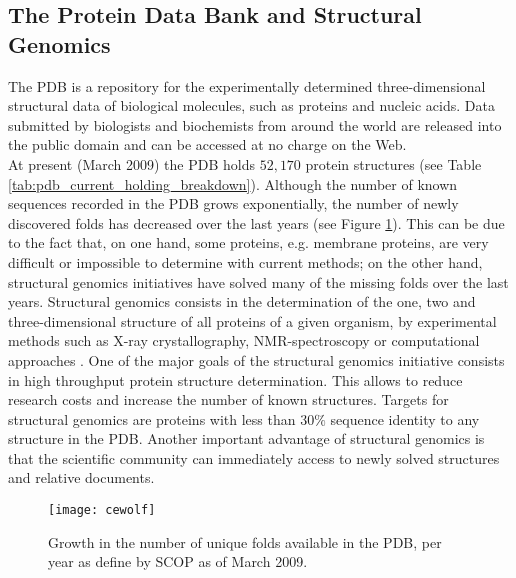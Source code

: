 \subsection{The Protein Data Bank and Structural Genomics}
\label{subsec:the_protein_data_bank_and_structural_genomics}
The \gls{PDB} \cite{Berman2002aa} is a repository for the experimentally determined three-\-di\-men\-sio\-nal structural data of biological molecules, such as proteins and nucleic acids. Data submitted by biologists and biochemists from around the world are released into the public domain and can be accessed at no charge on the Web.\\
At present (March 2009) the PDB holds $52,170$ protein structures (see Table \ref{tab:pdb_current_holding_breakdown}). 
Although the number of known sequences recorded in the PDB grows exponentially, the number of newly discovered folds has decreased over the last years (see Figure \ref{fig:cewolf}). This can be due to the fact that, on one hand, some proteins, e.g. membrane proteins, are very difficult or impossible to determine with current methods; on the other hand, structural genomics initiatives have solved many of the missing folds over the last years.
Structural genomics consists in the determination of the one, two and three-\-di\-men\-sio\-nal structure of all proteins of a given organism, by experimental methods such as X-ray crystallography, NMR-spectroscopy or computational approaches \cite{Chance2004aa}. One of the major goals of the structural genomics initiative consists in high throughput protein structure determination. This allows to reduce research costs and increase the number of known structures. Targets for structural genomics are proteins with less than $30\%$ sequence identity to any structure in the PDB. Another important advantage of structural genomics is that the scientific community can immediately access to newly solved structures and relative documents.
\begin{figure}[tb]
	\begin{center}
		\texttt{[image: cewolf]} 
		\caption[Growth in the number of unique folds available in the PDB, per year as define by SCOP]{Growth in the number of unique folds available in the PDB, per year as define by SCOP as of March 2009.}
		\label{fig:cewolf}
	\end{center}
\end{figure}

